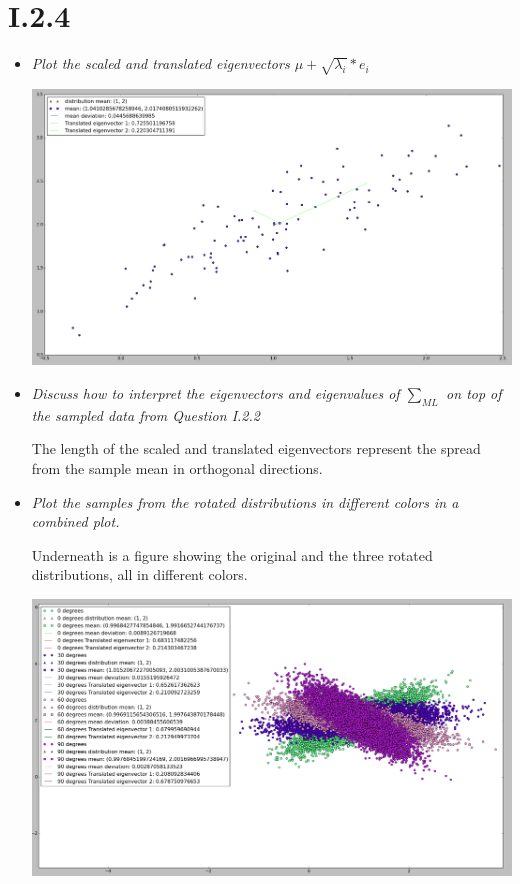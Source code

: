 \documentclass[12pt, a4paper]{article}
\begin{document}
\section{I.2.4}
\begin{itemize}
\item \textit{Plot the scaled and translated eigenvectors $\mu + \sqrt{\lambda_i} * e_i$}

\includegraphics[width=\textwidth]{5.png}

\item \textit{Discuss how to interpret the eigenvectors and eigenvalues of $\sum _{ML} $ on top of the sampled data from Question I.2.2}

The length of the scaled and translated eigenvectors represent the spread from the sample mean in orthogonal directions. 

\item \textit{Plot the samples from the rotated distributions in different colors in a combined plot.}

Underneath is a figure showing the original and the three rotated distributions, all in different colors.

\includegraphics[width=\textwidth]{6.png}


\end{itemize}
\end{document}
